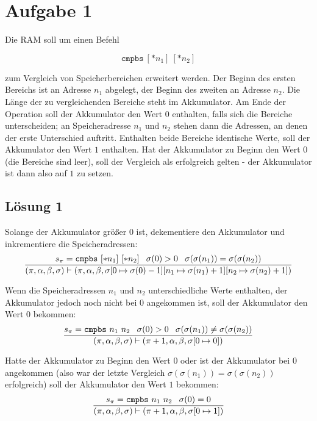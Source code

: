 \documentclass[main.tex]{subfiles}
\begin{document}
\section{Aufgabe 1}

Die RAM soll um einen Befehl

$$
    \mathtt{cmpbs} \ [ *n_{1}] \ [ *n_{2}]
$$

zum Vergleich von Speicherbereichen erweitert werden.
Der Beginn des ersten Bereichs ist an Adresse $n_1$ abgelegt, der Beginn des zweiten an Adresse $n_2$. Die Länge
der zu vergleichenden Bereiche steht im Akkumulator. Am Ende der Operation soll der Akkumulator den Wert $0$ enthalten, falls sich die Bereiche unterscheiden;
an Speicheradresse $n_1$ und $n_2$ stehen dann die Adressen, an denen der erste Unterschied auftritt.
Enthalten beide Bereiche identische Werte, soll der Akkumulator den Wert $1$ enthalten.
Hat der Akkumulator zu Beginn den Wert $0$ (die Bereiche sind leer), soll der Vergleich als erfolgreich gelten -
der Akkumulator ist dann also auf $1$ zu setzen.

\subsection*{Lösung 1}

Solange der Akkumulator größer 0 ist, dekementiere den Akkumulator und inkrementiere die Speicheradressen:
\begin{equation*}
    \frac{
        s_{\pi } =\mathtt{cmpbs} \ [*n_{1}] \ [*n_{2}] \kern+0.4em \kern+0.4em \sigma ( 0)  >0\kern+0.4em \kern+0.4em \sigma ( \sigma ( n_{1})) =\sigma ( \sigma ( n_{2}))
    }{
        ( \pi ,\alpha ,\beta ,\sigma ) \vdash ( \pi ,\alpha ,\beta ,\sigma [ 0\mapsto \sigma ( 0) -1][ n_{1} \mapsto \sigma ( n_{1}) +1][ n_{2} \mapsto \sigma ( n_{2}) +1])
    }
\end{equation*}


Wenn die Speicheradressen $n_{1}$ und $n_{2}$ unterschiedliche Werte enthalten, der Akkumulator jedoch noch nicht bei $0$ angekommen ist, soll der Akkumulator den Wert $0$ bekommen:
\begin{equation*}
    \frac{
        s_{\pi } =\mathtt{cmpbs} \ n_{1} \ n_{2} \kern+0.4em \kern+0.4em \sigma ( 0)  >0\kern+0.4em \kern+0.4em \sigma ( \sigma ( n_{1})) \neq \sigma ( \sigma ( n_{2}))
    }{
        ( \pi ,\alpha ,\beta ,\sigma ) \vdash ( \pi +1,\alpha ,\beta ,\sigma [ 0\mapsto 0])
    }
\end{equation*}


Hatte der Akkumulator zu Beginn den Wert $0$ oder ist der Akkumulator bei $0$ angekommen (also war der letzte Vergleich $\sigma ( \sigma ( n_{1})) =\sigma ( \sigma ( n_{2}))$ erfolgreich) soll der Akkumulator den Wert $1$ bekommen:
\begin{equation*}
    \frac{
        s_{\pi } =\mathtt{cmpbs} \ n_{1} \ n_{2} \kern+0.4em \kern+0.4em \sigma ( 0) =0
    }{
        ( \pi ,\alpha ,\beta ,\sigma ) \vdash ( \pi +1,\alpha ,\beta ,\sigma [ 0\mapsto 1])
    }
\end{equation*}
\end{document}
